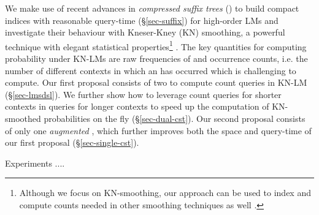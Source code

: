 We make use of recent advances in 
\emph{compressed suffix trees} (\CSTs) \cite{nv-csurv07} 
to build compact indices  
with reasonable query-time (\S\ref{sec-suffix}) 
for high-order  LMs and investigate their behaviour 
with Kneser-Kney (KN) smoothing,  
a powerful technique with elegant statistical properties\footnote{Although
we focus on KN-smoothing, our approach can be used to index and compute
counts needed in other smoothing techniques as well \cite{chen1996empirical}.}  
\cite{kneser1995improved}.
% 
The key quantities for computing probability under KN-LMs
are raw frequencies of \ngrams 
and occurrence counts, i.e. the number of different contexts 
in which an \ngram has 
occurred which is challenging to compute.
%
%
Our first proposal consists of two \CSTs to compute count queries 
in KN-LM (\S\ref{sec-lmsdsl}). 
% 
We further show how to leverage count queries for shorter contexts in queries for 
longer contexts to speed up the computation of KN-smoothed probabilities on the fly 
(\S\ref{sec-dual-cst}).
%
Our second proposal consists of only one \emph{augmented} \CST, which 
further improves both the space and query-time of our first proposal (\S\ref{sec-single-cst}). 
% 

Experiments ....


%

